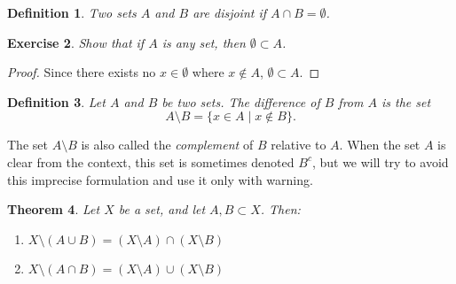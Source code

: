 \documentclass{amsart}
\newtheorem{theorem}{Theorem}
\newtheorem{definition}[theorem]{Definition}
\newtheorem{exercise}[theorem]{Exercise}
\newcommand{\1}{\mathds{1}}
\numberwithin{equation}{section}
\numberwithin{theorem}{section}
\begin{document}
\begin{definition}  
Two sets $A$ and $B$ are \emph{disjoint} if $A\cap B=\emptyset$.
\end{definition}  

\begin{exercise}  
Show that if $A$ is any set, then $\emptyset\subset A$.

\end{exercise}

\begin{proof}
	Since there exists no $x\in \emptyset$ where $x\notin A$, $\emptyset\subset A$.
\end{proof}

\begin{definition}  
Let $A$ and $B$ be two sets. 
The \emph{difference} of $B$ from $A$ is the set
\[
A \setminus B = \{ x \in A \mid x \notin B \}.
\]
\end{definition}

The set $A \setminus B$ is also called the \emph{complement} of $B$ relative to $A$.
When the set $A$ is clear from the context, this set is sometimes denoted $B^{c}$, but we will 
try to avoid this imprecise formulation and use it only with warning.



\begin{theorem} 
Let $X$ be a set, and let $A, B\subset X$.  Then:
\begin{enumerate}
\item[a)]
$X\setminus (A\cup B)=(X\setminus A)\cap (X\setminus B)$

\item[b)]
$X\setminus (A\cap B)=(X\setminus A)\cup (X\setminus B)$

\end{enumerate}
\end{theorem}
\end{document}
